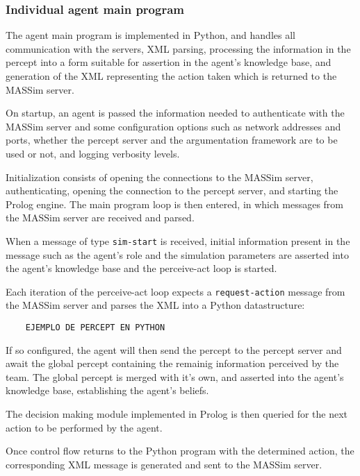 \subsubsection{Individual agent main program}
    The agent main program is implemented in Python, and handles all
    communication with the servers, XML parsing, processing the information in
    the percept into a form suitable for assertion in the agent's knowledge
    base, and generation of the XML representing the action taken which is
    returned to the MASSim server.

    On startup, an agent is passed the information needed to authenticate with
    the MASSim server and some configuration options such as network addresses
    and ports, whether the percept server and the argumentation framework are to
    be used or not, and logging verbosity levels.

    Initialization consists of opening the connections to the MASSim server,
    authenticating, opening the connection to the percept server, and starting
    the Prolog engine. The main program loop is then entered, in which messages
    from the MASSim server are received and parsed. 

    When a message of type \texttt{sim-start} is received, initial information
    present in the message such as the agent's role and the simulation
    parameters are asserted into the agent's knowledge base and the perceive-act
    loop is started.

    Each iteration of the perceive-act loop expects a \texttt{request-action}
    message from the MASSim server and parses the XML into a Python
    datastructure:

    \begin{verbatim}
    EJEMPLO DE PERCEPT EN PYTHON
    \end{verbatim}
    
    If so configured, the agent will then send the percept to the percept server
    and await the global percept containing the remainig information perceived
    by the team. The global percept is merged with it's own, and asserted into
    the agent's knowledge base, establishing the agent's beliefs.

    The decision making module implemented in Prolog is then queried for the
    next action to be performed by the agent.
    
    Once control flow returns to the Python program with the determined action,
    the corresponding XML message is generated and sent to the MASSim server. 

